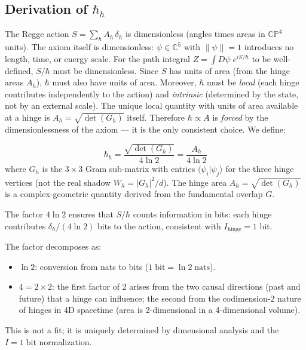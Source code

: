 \subsection{Derivation of $\hbar_h$}

The Regge action $S = \sum_h A_h\,\delta_h$ is dimensionless (angles times areas in $\mathbb{CP}^4$ units). The axiom itself is dimensionless: $\psi \in \mathbb{C}^5$ with $\|\psi\| = 1$ introduces no length, time, or energy scale. For the path integral $Z = \int D\psi\; e^{iS/\hbar}$ to be well-defined, $S/\hbar$ must be dimensionless. Since $S$ has units of area (from the hinge areas $A_h$), $\hbar$ must also have units of area. Moreover, $\hbar$ must be \emph{local} (each hinge contributes independently to the action) and \emph{intrinsic} (determined by the state, not by an external scale). The unique local quantity with units of area available at a hinge is $A_h = \sqrt{\det(G_h)}$ itself. Therefore $\hbar \propto A$ is \emph{forced} by the dimensionlessness of the axiom --- it is the only consistent choice. We define:

\begin{equation}
\boxed{\hbar_h = \frac{\sqrt{\det(G_h)}}{4\ln 2} = \frac{A_h}{4\ln 2}}
\label{eq:hbar}
\end{equation}
where $G_h$ is the $3 \times 3$ Gram sub-matrix with entries $\langle\psi_i|\psi_j\rangle$ for the three hinge vertices (not the real shadow $W_h = |G_h|^2/d$). The hinge area $A_h = \sqrt{\det(G_h)}$ is a complex-geometric quantity derived from the fundamental overlap $G$.

The factor $4\ln 2$ ensures that $S/\hbar$ counts information in bits: each hinge contributes $\delta_h/(4\ln 2)$ bits to the action, consistent with $I_\text{hinge} = 1$ bit.

\begin{remark}
The factor decomposes as:
\begin{itemize}
\item $\ln 2$: conversion from nats to bits ($1\;\text{bit} = \ln 2\;\text{nats}$).
\item $4 = 2 \times 2$: the first factor of 2 arises from the two causal directions (past and future) that a hinge can influence; the second from the codimension-2 nature of hinges in 4D spacetime (area is 2-dimensional in a 4-dimensional volume).
\end{itemize}
This is not a fit; it is uniquely determined by dimensional analysis and the $I = 1\;\text{bit}$ normalization.
\end{remark}

